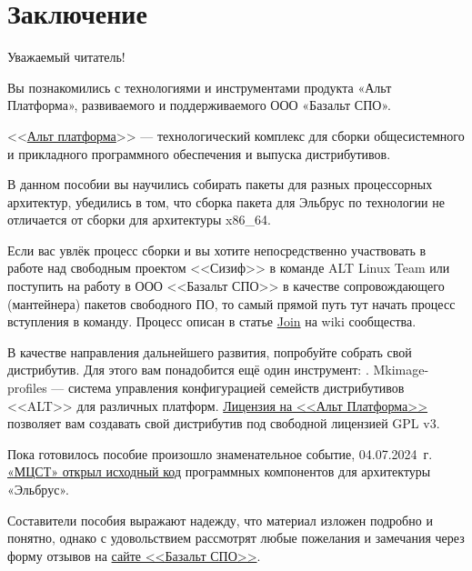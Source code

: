 \chapter*{Заключение}

Уважаемый читатель! 

Вы познакомились с технологиями и инструментами продукта «Альт Платформа», 
развиваемого и поддерживаемого ООО «Базальт СПО». 

<<\href{https://www.basealt.ru/alt-platform}{Альт платформа}>> --- 
технологический комплекс для сборки общесистемного 
и прикладного программного обеспечения и выпуска дистрибутивов. 

В данном пособии вы научились собирать пакеты для разных процессорных архитектур,
убедились в том, что сборка пакета для Эльбрус по технологии не отличается от сборки для 
архитектуры x86\_64. 

Если вас увлёк процесс сборки и вы хотите непосредственно участвовать в работе над свободным 
проектом <<Сизиф>> в команде ALT Linux Team или поступить 
на работу в ООО <<Базальт СПО>> в качестве сопровождающего (мантейнера) пакетов свободного ПО, 
то самый прямой путь тут начать процесс вступления в команду. Процесс описан в статье 
\href{https://www.altlinux.org/Join}{Join} на wiki сообщества. 

В качестве направления дальнейшего развития, попробуйте 
собрать свой дистрибутив. Для этого вам понадобится ещё один 
инструмент: \href{https://www.altlinux.org/Mkimage-profiles}{}.
Mkimage-profiles --- система управления конфигурацией семейств дистрибутивов <<ALT>> для различных платформ.
\href{https://www.basealt.ru/fileadmin/docs/License_Alt-Platform_10.pdf}{Лицензия на <<Альт Платформа>>} 
позволяет вам создавать свой дистрибутив под свободной лицензией GPL v3.

Пока готовилось пособие произошло знаменательное событие, 04.07.2024~г. \href{https://arppsoft.ru/news/arpp/16516/}{%
	«МЦСТ» открыл исходный код} программных компонентов для архитектуры «Эльбрус».

Составители пособия выражают надежду, что материал изложен подробно и понятно, 
однако с удовольствием рассмотрят любые пожелания и замечания через форму отзывов 
на \href{https://www.basealt.ru/contacts}{сайте <<Базальт СПО>>}.
